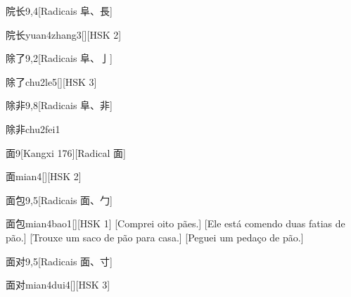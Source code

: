 \begin{entry}{院长}{9,4}[Radicais ⾩、⾧]
  \begin{phonetics}{院长}{yuan4zhang3}[][HSK 2]
  \end{phonetics}
\end{entry}

\begin{entry}{除了}{9,2}[Radicais ⾩、⼅]
  \begin{phonetics}{除了}{chu2le5}[][HSK 3]
  \end{phonetics}
\end{entry}

\begin{entry}{除非}{9,8}[Radicais ⾩、⾮]
  \begin{phonetics}{除非}{chu2fei1}
  \end{phonetics}
\end{entry}

\begin{entry}{面}{9}[Kangxi 176][Radical ⾯]
  \begin{phonetics}{面}{mian4}[][HSK 2]
  \end{phonetics}
\end{entry}

\begin{entry}{面包}{9,5}[Radicais ⾯、⼓]
  \begin{phonetics}{面包}{mian4bao1}[][HSK 1]
    [Comprei oito pães.]
    [Ele está comendo duas fatias de pão.]
    [Trouxe um saco de pão para casa.]
    [Peguei um pedaço de pão.]
  \end{phonetics}
\end{entry}

\begin{entry}{面对}{9,5}[Radicais ⾯、⼨]
  \begin{phonetics}{面对}{mian4dui4}[][HSK 3]
  \end{phonetics}
\end{entry}

